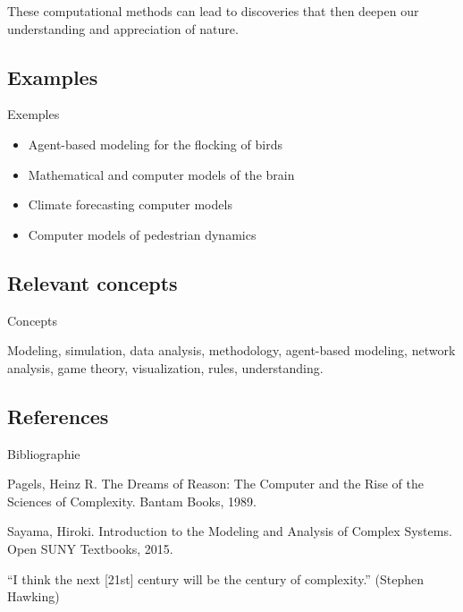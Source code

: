 \documentclass[12pt]{article}
\begin{document}
These computational methods can lead to discoveries that then deepen our understanding and appreciation of nature.


\subsection*{Examples}{Exemples}

\begin{itemize}
	\item Agent-based modeling for the flocking of birds
        \item Mathematical and computer models of the brain
        \item Climate forecasting computer models
        \item Computer models of pedestrian dynamics	
\end{itemize}


\subsection*{Relevant concepts}{Concepts}

Modeling, simulation, data analysis, methodology, agent-based modeling, network analysis, game theory, visualization, rules, understanding.



\subsection{References}{Bibliographie}

Pagels, Heinz R. The Dreams of Reason: The Computer and the Rise of the Sciences of Complexity. Bantam Books, 1989.

Sayama, Hiroki. Introduction to the Modeling and Analysis of Complex Systems. Open SUNY Textbooks, 2015.



``I think the next [21st] century will be the century of complexity.'' (Stephen Hawking)
\end{document}
